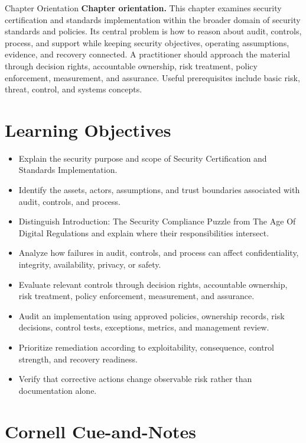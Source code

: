 \documentclass[11pt,letterpaper]{article}
\title{\CornellDocumentTitle}
\author{}
\date{}
\begin{document}
\maketitle
\begin{CornellOverviewBox}{Chapter Orientation}
\textbf{Chapter orientation.} This chapter examines security certification and standards implementation within the broader domain of security standards and policies. Its central problem is how to reason about audit, controls, process, and support while keeping security objectives, operating assumptions, evidence, and recovery connected. A practitioner should approach the material through decision rights, accountable ownership, risk treatment, policy enforcement, measurement, and assurance. Useful prerequisites include basic risk, threat, control, and systems concepts.
\end{CornellOverviewBox}
\section*{Learning Objectives}
\begin{itemize}
\item Explain the security purpose and scope of Security Certification and Standards Implementation.
\item Identify the assets, actors, assumptions, and trust boundaries associated with audit, controls, and process.
\item Distinguish Introduction: The Security Compliance Puzzle from The Age Of Digital Regulations and explain where their responsibilities intersect.
\item Analyze how failures in audit, controls, and process can affect confidentiality, integrity, availability, privacy, or safety.
\item Evaluate relevant controls through decision rights, accountable ownership, risk treatment, policy enforcement, measurement, and assurance.
\item Audit an implementation using approved policies, ownership records, risk decisions, control tests, exceptions, metrics, and management review.
\item Prioritize remediation according to exploitability, consequence, control strength, and recovery readiness.
\item Verify that corrective actions change observable risk rather than documentation alone.
\end{itemize}
\section*{Cornell Cue-and-Notes}
\end{document}

